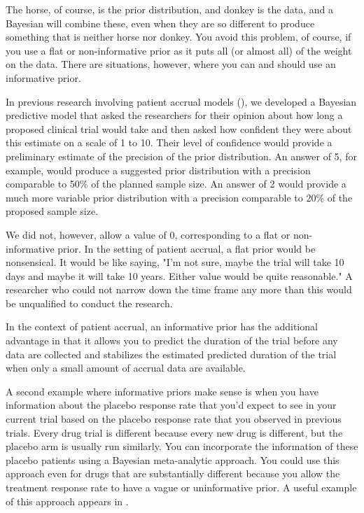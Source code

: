 \documentclass[12pt]{article}
\begin{document}
The horse, of course, is the prior distribution, and donkey is the data, and a Bayesian will combine these, even when they are so different to produce something that is neither horse nor donkey. You avoid this problem, of course, if you use a flat or non-informative prior as it puts all (or almost all) of the weight on the data. There are situations, however, where you can and should use an informative prior.

In previous research involving patient accrual models (\cite{gajewski08}), we developed a Bayesian predictive model that asked the researchers for their opinion about how long a proposed clinical trial would take and then asked how confident they were about this estimate on a scale of 1 to 10. Their level of confidence would provide a preliminary estimate of the precision of the prior distribution. An answer of 5, for example, would produce a suggested prior distribution with a precision comparable to 50\% of the planned sample size. An answer of 2 would provide a much more variable prior distribution with a precision comparable to 20\% of the proposed sample size.

We did not, however, allow a value of 0, corresponding to a flat or non-informative prior. In the setting of patient accrual, a flat prior would be nonsensical. It would be like saying, "I'm not sure, maybe the trial will take 10 days and maybe it will take 10 years. Either value would be quite reasonable." A researcher who could not narrow down the time frame any more than this would be unqualified to conduct the research.

In the context of patient accrual, an informative prior has the additional advantage in that it allows you to predict the duration of the trial before any data are collected and stabilizes the estimated predicted duration of the trial when only a small amount of accrual data are available.

A second example where informative priors make sense is when you have information about the placebo response rate that you'd expect to see in your current trial based on the placebo response rate that you observed in previous trials. Every drug trial is different because every new drug is different, but the placebo arm is usually run similarly. You can incorporate the information of these placebo patients using a Bayesian meta-analytic approach. You could use this approach even for drugs that are substantially different because you allow the treatment response rate to have a vague or uninformative prior. A useful example of this approach appears in \cite{walley15}.
\end{document}
